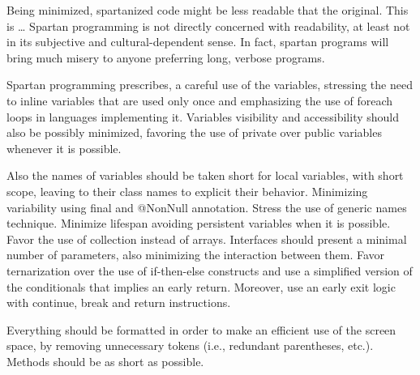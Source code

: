 Being minimized, spartanized code might be less readable that the original.
This is … Spartan programming is not directly concerned with readability, at
least not in its subjective and cultural-dependent sense. In fact, spartan
programs will bring much misery to anyone preferring long, verbose programs.

Spartan programming prescribes, a careful use of the variables, stressing the need
to inline variables that are used only once and emphasizing the use of foreach loops
in languages implementing it. Variables visibility and accessibility should also be
possibly minimized, favoring the use of private over public variables whenever it
is possible.

Also the names of variables should be taken short for local variables, with
short scope, leaving to their class names to explicit their behavior.
Minimizing variability using final and @NonNull annotation. Stress the use of
generic names technique. Minimize lifespan avoiding persistent variables when
it is possible. Favor the use of collection instead of arrays. Interfaces
should present a minimal number of parameters, also minimizing the interaction
between them. Favor ternarization over the use of if-then-else constructs and
use a simplified version of the conditionals that implies an early return.
Moreover, use an early exit logic with continue, break and return instructions.

Everything should be formatted in order to make an efficient use of the screen
space, by removing unnecessary tokens (i.e., redundant parentheses, etc.).
Methods should be as short as possible.
